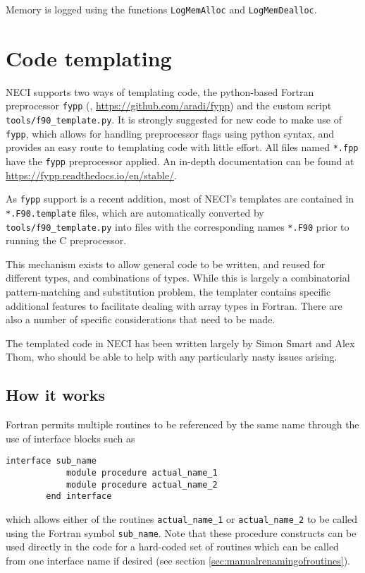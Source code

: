 \documentclass[a4paper,notitlepage,dvipsnames]{scrreprt}
\let\code\lstinline
\begin{document}
	Memory is logged using the functions \code{LogMemAlloc} and
	\code{LogMemDealloc}.

\section{Code templating}
\label{sect:templating}
    NECI supports two ways of templating code, the python-based Fortran
    preprocessor \code{fypp} (,
    \url{https://github.com/aradi/fypp}) and the custom script
    \code{tools/f90_template.py}. It is strongly suggested for new code to
    make use of \code{fypp}, which allows for handling preprocessor flags
    using python syntax, and provides an easy route to templating code with
    little effort. All files named \code{*.fpp} have the \code{fypp}
    preprocessor applied. An in-depth documentation can be found at \url{https://fypp.readthedocs.io/en/stable/}.

    As \code{fypp} support is a recent addition, most of NECI's templates are
    contained in \code{*.F90.template} files, which are automatically converted by
    \code{tools/f90_template.py} into files with the corresponding names
	\code{*.F90} prior to running the C preprocessor.

	This mechanism exists to allow general code to be written, and reused for
	different types, and combinations of types. While this is largely a
	combinatorial pattern-matching and substitution problem, the templater
	contains specific additional features to facilitate dealing with array
	types in Fortran. There are also a number of specific considerations that
	need to be made.

	The templated code in NECI has been written largely by Simon Smart and Alex
	Thom, who should be able to help with any particularly nasty issues
	arising.

\subsection{How it works}
	Fortran permits multiple routines to be referenced by the same name through
	the use of interface blocks such as
	\begin{lstlisting}[gobble=4]
		interface sub_name
			module procedure actual_name_1
			module procedure actual_name_2
		end interface
	\end{lstlisting}
	which allows either of the routines \code{actual_name_1} or
	\code{actual_name_2} to be called using the Fortran symbol
	\code{sub_name}. Note that these procedure constructs can be used directly in the code
	for a hard-coded set of routines which can be called from one interface name if desired (see section \ref{sec:manualrenamingofroutines}).
\end{document}
